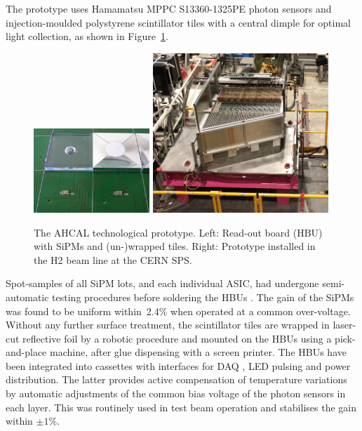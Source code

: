 The prototype uses Hamamatsu MPPC S13360-1325PE photon sensors and injection-moulded polystyrene scintillator tiles with a central dimple \cite{Liu:2015cpe} for optimal light collection, as shown in Figure~\ref{fig:AHCAL-TileProto}. 
\begin{figure}[hbt]
\centering
\includegraphics[width=0.39\textwidth]{Detector/fig/hcal-tiles.jpeg}
\includegraphics[width=0.59\textwidth]{Detector/fig/AHCAL-prototype.jpeg}
\caption{The AHCAL technological prototype. Left: Read-out board (HBU) with SiPMs and (un-)wrapped tiles. Right: Prototype installed in the H2 beam line at the CERN SPS.} 
\label{fig:AHCAL-TileProto}
\end{figure}
%
Spot-samples of all SiPM lots, and each individual ASIC, had undergone semi-automatic testing procedures before soldering the HBUs \cite{Munwes:2634923}. The gain of the SiPMs was found to be uniform within~2.4\% when operated at a common over-voltage.
Without any further surface treatment, the scintillator tiles are wrapped in laser-cut reflective foil by a robotic procedure and mounted on the HBUs using a pick-and-place machine, after glue dispensing with a screen printer.   
%
The HBUs have been integrated into cassettes with interfaces for DAQ \cite{Kvasnicka:2017bpx}, LED pulsing and power distribution. The latter provides active compensation of temperature variations by automatic adjustments of the common bias voltage of the photon sensors in each layer. This was routinely used in test beam operation and stabilises the gain within $\pm 1\%$.
